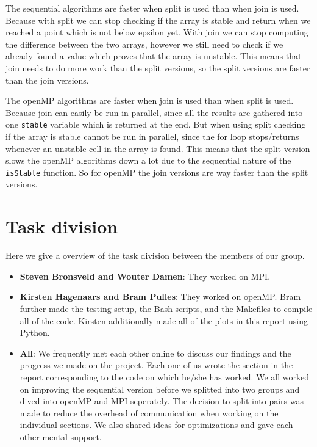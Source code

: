 \documentclass[a4paper]{article}
\begin{document}
The sequential algorithms are faster when split is used than when join is used. Because with split we can stop checking if the array is stable and return when we reached a point which is not below epsilon yet. With join we can stop computing the difference between the two arrays, however we still need to check if we already found a value which proves that the array is unstable. This means that join needs to do more work than the split versions, so the split versions are faster than the join versions.

The openMP algorithms are faster when join is used than when split is used. Because join can easily be run in parallel, since all the results are gathered into one \texttt{stable} variable which is returned at the end. But when using split checking if the array is stable cannot be run in parallel, since the for loop stops/returns whenever an unstable cell in the array is found. This means that the split version slows the openMP algorithms down a lot due to the sequential nature of the \texttt{isStable} function. So for openMP the join versions are way faster than the split versions.


\section{Task division}
Here we give a overview of the task division between the members of our group.
\begin{itemize}
    \item \textbf{Steven Bronsveld and Wouter Damen}: They worked on MPI.
    \item \textbf{Kirsten Hagenaars and Bram Pulles}: They worked on openMP. Bram further made the testing setup, the Bash scripts, and the Makefiles to compile all of the code. Kirsten additionally made all of the plots in this report using Python.
    \item \textbf{All}: We frequently met each other online to discuss our findings and the progress we made on the project. Each one of us wrote the section in the report corresponding to the code on which he/she has worked. We all worked on improving the sequential version before we splitted into two groups and dived into openMP and MPI seperately. The decision to split into pairs was made to reduce the overhead of communication when working on the individual sections. We also shared ideas for optimizations and gave each other mental support.
\end{itemize}
\end{document}
